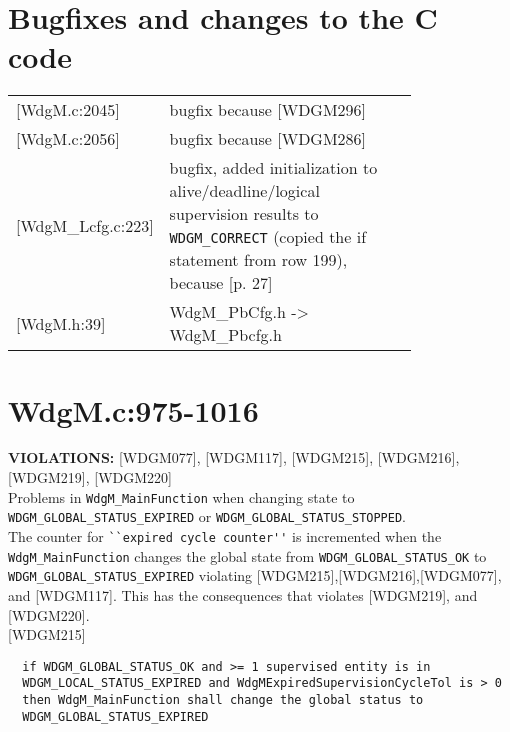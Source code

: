 \documentclass[11pt,a4paper]{article}
\begin{document}
\section{Bugfixes and changes to the C code}
\begin{longtable}{l p{0.8\linewidth}}

[WdgM.c:2045] & bugfix because [WDGM296]\\

[WdgM.c:2056] & bugfix because [WDGM286]\\

[WdgM\_Lcfg.c:223] & bugfix, added initialization to alive/deadline/logical supervision results to \verb!WDGM_CORRECT! (copied the if statement from row 199), because [p. 27]\\

[WdgM.h:39] & WdgM\_PbCfg.h -> WdgM\_Pbcfg.h\\
\end{longtable}

\newpage
\lstset{language=c}
\lstset{language=autosar}

\section{WdgM.c:975-1016}
\textbf{VIOLATIONS:} [WDGM077], [WDGM117], [WDGM215], [WDGM216], [WDGM219],
[WDGM220]\\[0.5cm]

Problems in \lstinline!WdgM_MainFunction! when changing state to
\lstinline!WDGM_GLOBAL_STATUS_EXPIRED! or
\lstinline!WDGM_GLOBAL_STATUS_STOPPED!.\\[0.5cm]

The counter for \lstinline!``expired cycle counter''! is incremented when the
\lstinline!WdgM_MainFunction! changes the global state from
\lstinline!WDGM_GLOBAL_STATUS_OK! to \lstinline!WDGM_GLOBAL_STATUS_EXPIRED!
violating [WDGM215],[WDGM216],[WDGM077], and [WDGM117].
This has the consequences that violates [WDGM219], and [WDGM220].\\

[WDGM215]
\begin{lstlisting}
  if WDGM_GLOBAL_STATUS_OK and >= 1 supervised entity is in
  WDGM_LOCAL_STATUS_EXPIRED and WdgMExpiredSupervisionCycleTol is > 0
  then WdgM_MainFunction shall change the global status to
  WDGM_GLOBAL_STATUS_EXPIRED
\end{lstlisting}~\\
\end{document}
